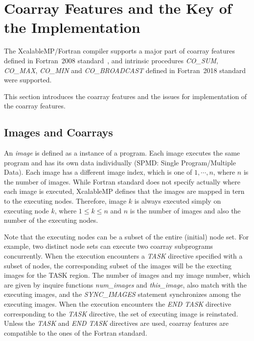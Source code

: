\section{Coarray Features and the Key of the Implementation}\label{sec:lang}

The XcalableMP/Fortran compiler supports a major part of coarray features defined in 
Fortran~2008 standard~\cite{F08}, and intrinsic procedures 
{\em CO\_SUM}, {\em CO\_MAX}, {\em CO\_MIN} and {\em CO\_BROADCAST} defined in 
Fortran~2018 standard~\cite{F18} were supported.

This section introduces the coarray features and the issues for implementation of 
the coarray features.

\subsection{Images and Coarrays}

An {\em image} is defined as a instance of a program. 
Each image executes the same program and has its own data individually 
(SPMD: Single Program/Multiple Data).
Each image has a different image index, which is one of $1, \cdots, n$, 
where $n$ is the number of images. 
While Fortran standard does not specify actually where each image is executed, 
XcalableMP defines that the images are mapped in tern to the executing nodes. 
Therefore, image $k$ is always executed simply on executing node $k$, 
where $1 \leq k \leq n$ and 
$n$ is the number of images and also the number of the executing nodes. 

Note that the executing nodes can be a subset of the entire (initial) node set. 
For example, two distinct node sets can execute two coarray subprograms concurrently.
When the execution encounters a {\em TASK} directive specified with a subset of nodes,
the corresponding subset of the images will be the execting images for the
TASK region. 
The number of images and my image number, which are given by inquire functions
{\em num\_images} and {\em this\_image}, also match with the executing images, and
the {\em SYNC\_IMAGES} statement synchronizes among the executing images.
When the execution encounters the {\em END TASK} directive corresponding to the
{\em TASK} directive, the set of executing image is reinstated.
Unless the {\em TASK} and {\em END TASK} directives are used, coarray features are 
compatible to the ones of the Fortran standard. 

